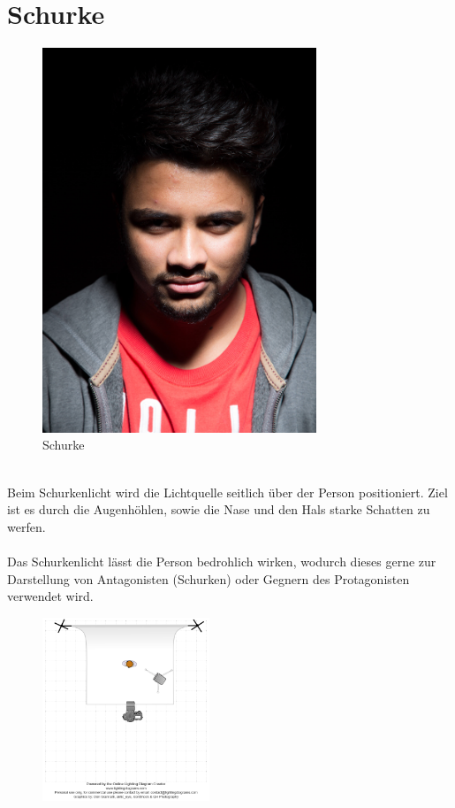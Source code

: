 \documentclass[landscape, notoc]{school}
\begin{document}
\newpage
\section{Schurke}
\begin{minipage}[t]{.4\textwidth}
\begin{figure}[H]
	\centering
	\includegraphics[height=11.5cm]{3-schurke.jpg}
	\caption{Schurke}
\end{figure}
\end{minipage}
\begin{minipage}[t]{.6\textwidth}~\\
Beim Schurkenlicht wird die Lichtquelle seitlich über der Person positioniert. Ziel ist es durch die Augenhöhlen, sowie die Nase und den Hals starke Schatten zu werfen.
\\\\
Das Schurkenlicht lässt die Person bedrohlich wirken, wodurch dieses gerne zur Darstellung von Antagonisten (Schurken) oder Gegnern des Protagonisten verwendet wird.
\begin{figure}[H]
	\centering
	\includegraphics[width=5cm]{3-schurke-diagram.png}
\end{figure}
\end{minipage}
\end{document}
